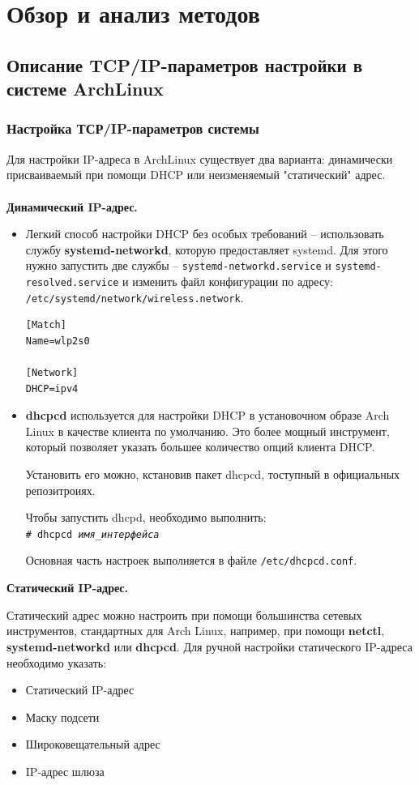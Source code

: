 \documentclass[a4paper]{article}
\begin{document}
\section{Обзор и анализ методов}
\subsection{Описание TCP/IP-параметров настройки в системе ArchLinux}
	\subsubsection{Настройка ТСР/IP-параметров системы}
	
	Для настройки IP-адреса в ArchLinux существует два варианта: динамически присваиваемый при помощи DHCP или неизменяемый "статический" адрес.
	\\\\
	\textbf{Динамический IP-адрес.}
	\begin{itemize}
		\item Легкий способ настройки DHCP без особых требований -- использовать службу \textbf{systemd-networkd}, которую предоставляет systemd. Для этого нужно запустить две службы -- \texttt{systemd-networkd.service} и \texttt{systemd-resolved.service} и изменить файл конфигурации по адресу: \texttt{/etc/systemd/network/wireless.network}.
		\begin{verbatim}
[Match]
Name=wlp2s0

[Network]
DHCP=ipv4
	\end{verbatim}

		\item \textbf{dhcpcd} используется для настройки DHCP в установочном образе Arch Linux в качестве клиента по умолчанию. Это более мощный инструмент, который позволяет указать большее количество опций клиента DHCP.
		
		Установить его можно, кстановив пакет dhcpcd, тоступный в официальных репозитроиях.
		
		Чтобы запустить dhcpd, необходимо выполнить:\\
		\texttt{\# dhcpcd \emph{имя\_интерфейса}}
		
		Основная часть настроек выполняется в файле \texttt{/etc/dhcpcd.conf}.
	\end{itemize}
	\textbf{Статический IP-адрес.}
	
	Статический адрес можно настроить при помощи большинства сетевых инструментов, стандартных для Arch Linux, например, при помощи \textbf{netctl}, \textbf{systemd-networkd} или \textbf{dhcpcd}.
	Для ручной настройки статического IP-адреса необходимо указать:
	\begin{itemize}
		\item Статический IP-адрес
		\item Маску подсети
		\item Широковещательный адрес
		\item IP-адрес шлюза
	\end{itemize}
	
\end{document}
